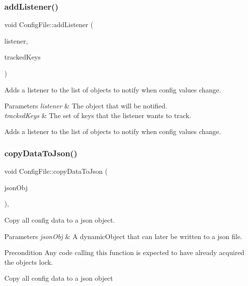 \subsubsection{\texorpdfstring{add\+Listener()}{addListener()}}
{\footnotesize\ttfamily void Config\+File\+::add\+Listener (\begin{DoxyParamCaption}\item[{\mbox{\hyperlink{classConfigFile_1_1Listener}{Config\+File\+::\+Listener}} $\ast$}]{listener,  }\item[{String\+Array}]{tracked\+Keys }\end{DoxyParamCaption})}

Adds a listener to the list of objects to notify when config values change.


\begin{DoxyParams}{Parameters}
{\em listener} & The object that will be notified.\\
\hline
{\em tracked\+Keys} & The set of keys that the listener wants to track.\\
\hline
\end{DoxyParams}
Adds a listener to the list of objects to notify when config values change. \mbox{\label{classConfigFile_a89902824e2b6cbd394a10530637ad3d7}} 
\subsubsection{\texorpdfstring{copy\+Data\+To\+Json()}{copyDataToJson()}}
{\footnotesize\ttfamily void Config\+File\+::copy\+Data\+To\+Json (\begin{DoxyParamCaption}\item[{Dynamic\+Object\+::\+Ptr}]{json\+Obj }\end{DoxyParamCaption})\hspace{0.3cm}{\ttfamily [protected]}, {\ttfamily [virtual]}}

Copy all config data to a json object.


\begin{DoxyParams}{Parameters}
{\em json\+Obj} & A dynamic\+Object that can later be written to a json file.\\
\hline
\end{DoxyParams}
\begin{DoxyPrecond}{Precondition}
Any code calling this function is expected to have already acquired the object\textquotesingle{}s lock.
\end{DoxyPrecond}
Copy all config data to a json object \mbox{\label{classConfigFile_adad78b3b99b0176b8f59310905fe6671}} 

